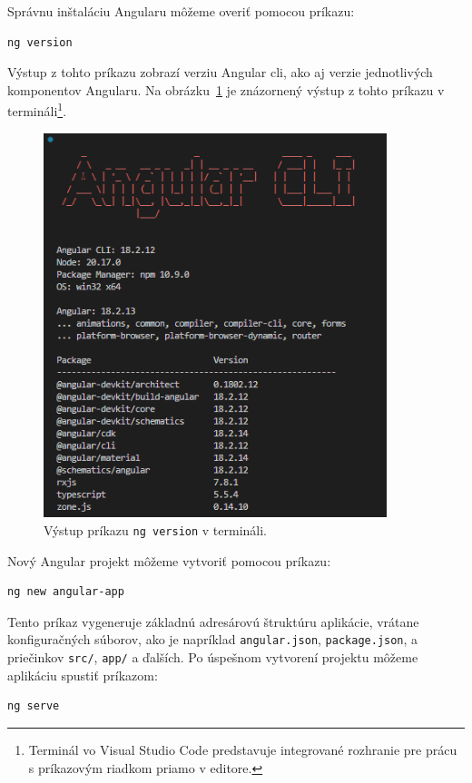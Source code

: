 Správnu inštaláciu Angularu môžeme overiť pomocou príkazu:

\begin{verbatim}
ng version
\end{verbatim}

Výstup z tohto príkazu zobrazí verziu Angular \acrshort{cli}, ako aj verzie jednotlivých komponentov Angularu. Na obrázku~\ref{fig:ng-version} je znázornený výstup z tohto príkazu v termináli\footnote{Terminál vo Visual Studio Code predstavuje integrované rozhranie pre prácu s príkazovým riadkom priamo v editore.}.

\begin{figure}[H]
  \centering
  \includegraphics[width=10cm]{img/ng-version.png}
  \caption{Výstup príkazu \texttt{ng version} v termináli.}
  \label{fig:ng-version}
\end{figure}

\bigskip
Nový Angular projekt môžeme vytvoriť pomocou príkazu:

\begin{verbatim}
ng new angular-app
\end{verbatim}

Tento príkaz vygeneruje základnú adresárovú štruktúru aplikácie, vrátane konfiguračných súborov, ako je napríklad \texttt{angular.json}, \texttt{package.json}, a priečinkov \texttt{src/}, \texttt{app/} a ďalších. Po úspešnom vytvorení projektu môžeme aplikáciu spustiť príkazom:

\begin{verbatim}
ng serve
\end{verbatim}


